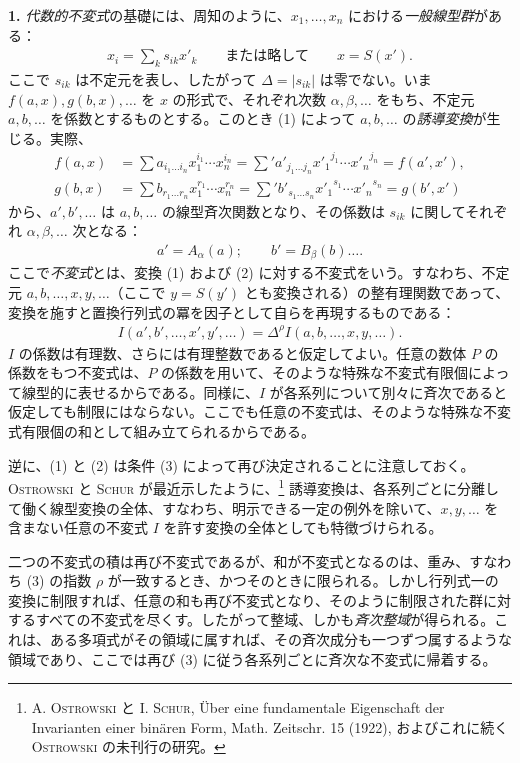 \documentclass[11pt]{article}
\newcommand{\D}{\Delta}
\newcommand{\srcnumdisplay}[2]{\begin{equation*}\tag*{#1}\begin{aligned}#2\end{aligned}\end{equation*}}
\begin{document}
\textbf{1.} \emph{代数的不変式}の基礎には、周知のように、$x_1,\ldots,x_n$ における\emph{一般線型群}がある：
\srcnumdisplay{(1)}{x_i=\sum_k s_{ik}x'_k
\qquad\text{または略して}\qquad x=S(x').}
ここで $s_{ik}$ は不定元を表し、したがって $\D=|s_{ik}|$ は零でない。いま $f(a,x),g(b,x),\ldots$ を $x$ の形式で、それぞれ次数 $\alpha,\beta,\ldots$ をもち、不定元 $a,b,\ldots$ を係数とするものとする。このとき (1) によって $a,b,\ldots$ の\emph{誘導変換}が生じる。実際、
\[
\begin{aligned}
f(a,x)&=\sum a_{i_1\ldots i_n}x_1^{i_1}\cdots x_n^{i_n}
      =\sum{}' a'_{j_1\ldots j_n}{x'_1}^{j_1}\cdots {x'_n}^{j_n}
      =f(a',x'),\\
g(b,x)&=\sum b_{r_1\ldots r_n}x_1^{r_1}\cdots x_n^{r_n}
      =\sum{}' b'_{s_1\ldots s_n}{x'_1}^{s_1}\cdots {x'_n}^{s_n}
      =g(b',x')
\end{aligned}
\]
から、$a',b',\ldots$ は $a,b,\ldots$ の線型斉次関数となり、その係数は $s_{ik}$ に関してそれぞれ $\alpha,\beta,\ldots$ 次となる：
\srcnumdisplay{(2)}{a'=A_\alpha(a);\qquad b'=B_\beta(b)\ldots .}
ここで\emph{不変式}とは、変換 (1) および (2) に対する不変式をいう。すなわち、不定元 $a,b,\ldots,x,y,\ldots$（ここで $y=S(y')$ とも変換される）の整有理関数であって、変換を施すと置換行列式の冪を因子として自らを再現するものである：
\srcnumdisplay{(3)}{I(a',b',\ldots,x',y',\ldots)
=\D^\rho I(a,b,\ldots,x,y,\ldots).}
$I$ の係数は有理数、さらには有理整数であると仮定してよい。任意の数体 $P$ の係数をもつ不変式は、$P$ の係数を用いて、そのような特殊な不変式有限個によって線型的に表せるからである。同様に、$I$ が各系列について別々に斉次であると仮定しても制限にはならない。ここでも任意の不変式は、そのような特殊な不変式有限個の和として組み立てられるからである。

逆に、(1) と (2) は条件 (3) によって再び決定されることに注意しておく。\textsc{Ostrowski} と \textsc{Schur} が最近示したように、\footnote{A. \textsc{Ostrowski} と I. \textsc{Schur}, Über eine fundamentale Eigenschaft der Invarianten einer binären Form, Math. Zeitschr. 15 (1922), およびこれに続く \textsc{Ostrowski} の未刊行の研究。} 誘導変換は、各系列ごとに分離して働く線型変換の全体、すなわち、明示できる一定の例外を除いて、$x,y,\ldots$ を含まない任意の不変式 $I$ を許す変換の全体としても特徴づけられる。

二つの不変式の積は再び不変式であるが、和が不変式となるのは、重み、すなわち (3) の指数 $\rho$ が一致するとき、かつそのときに限られる。しかし行列式一の変換に制限すれば、任意の和も再び不変式となり、そのように制限された群に対するすべての不変式を尽くす。したがって整域、しかも\emph{斉次整域}が得られる。これは、ある多項式がその領域に属すれば、その斉次成分も一つずつ属するような領域であり、ここでは再び (3) に従う各系列ごとに斉次な不変式に帰着する。
\end{document}
